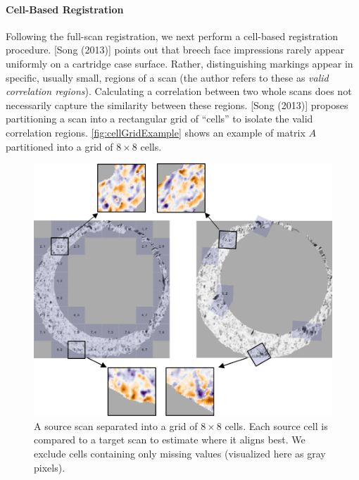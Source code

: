 \documentclass[
]{jdssv}
\begin{document}
\hypertarget{cell-based-registration}{%
\paragraph{Cell-Based Registration}\label{cell-based-registration}}

Following the full-scan registration, we next perform a cell-based
registration procedure. {[}Song (2013){]} points out that breech face
impressions rarely appear uniformly on a cartridge case surface. Rather,
distinguishing markings appear in specific, usually small, regions of a
scan (the author refers to these as \emph{valid correlation regions}).
Calculating a correlation between two whole scans does not necessarily
capture the similarity between these regions. {[}Song (2013){]} proposes
partitioning a scan into a rectangular grid of ``cells'' to isolate the
valid correlation regions. \autoref{fig:cellGridExample} shows an
example of matrix \(A\) partitioned into a grid of \(8 \times 8\) cells.

\begin{CodeChunk}
\begin{figure}[htbp]

{\centering \includegraphics[width=\textwidth]{images/cellGridExample} 

}

\caption{\label{fig:cellGridExample} A source scan separated into a grid of $8 \times 8$ cells. Each source cell is compared to a target scan to estimate where it aligns best. We exclude cells containing only missing values (visualized here as gray pixels).}\label{fig:unnamed-chunk-7}
\end{figure}
\end{CodeChunk}
\end{document}

